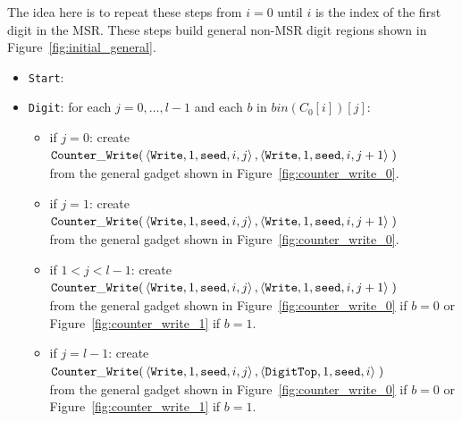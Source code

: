 The idea here is to repeat these steps from $i = 0$ until $i$ is the index of the first digit in the MSR. These
steps build general non-MSR digit regions shown in Figure~\ref{fig:initial_general}.


\begin{itemize}
    \item {\tt Start}:

    \item {\tt Digit}: for each $j=0,\ldots,l-1$ and each $b$ in $bin(C_0[i])[j]$:
    \begin{itemize}
        \item if $j = 0$: create
        $\begin{aligned}[t]
            {\tt Counter\_Write}(&\left\langle {\tt Write}, 1, {\tt seed}, i, j \right\rangle, \left\langle {\tt Write}, 1, {\tt seed}, i, j + 1 \right\rangle \;)
        \end{aligned}$\\from the general gadget shown in Figure~\ref{fig:counter_write_0}.

        \item if $j = 1$: create
        $\begin{aligned}[t]
            {\tt Counter\_Write}(&\left\langle {\tt Write}, 1, {\tt seed}, i, j \right\rangle, \left\langle {\tt Write}, 1, {\tt seed}, i, j + 1 \right\rangle \;)
        \end{aligned}$\\from the general gadget shown in Figure~\ref{fig:counter_write_0}.

        \item if $1 < j < l-1$: create
        $\begin{aligned}[t]
            {\tt Counter\_Write}(&\left\langle {\tt Write}, 1, {\tt seed}, i, j \right\rangle, \left\langle {\tt Write}, 1, {\tt seed}, i, j + 1 \right\rangle \;)
        \end{aligned}$\\from the general gadget shown in Figure~\ref{fig:counter_write_0} if $b = 0$ or Figure~\ref{fig:counter_write_1} if $b = 1$.

        \item if $j = l-1$: create
        $\begin{aligned}[t]
            {\tt Counter\_Write}(&\left\langle {\tt Write}, 1, {\tt seed}, i, j \right\rangle, \left\langle {\tt DigitTop}, 1, {\tt seed}, i \right\rangle \;)
        \end{aligned}$\\from the general gadget shown in Figure~\ref{fig:counter_write_0} if $b = 0$ or Figure~\ref{fig:counter_write_1} if $b = 1$.
    \end{itemize}



\end{itemize}
